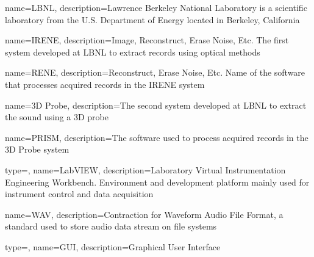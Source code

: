 %

{
    name=LBNL,
    description={Lawrence Berkeley National Laboratory is a scientific laboratory from the U.S. Department of Energy located in Berkeley, California}
}

{
    name=IRENE,
    description={Image, Reconstruct, Erase Noise, Etc. The first system developed at LBNL to extract records using optical methods}
}

{
    name=RENE,
    description={Reconstruct, Erase Noise, Etc. Name of the software that processes acquired records in the IRENE system}
}

{
    name=3D Probe,
    description={The second system developed at LBNL to extract the sound using a 3D probe}
}

{
    name=PRISM,
    description={The software used to process acquired records in the 3D Probe system}
}

{
    type=\acronymtype,
    name={LabVIEW},
    description={Laboratory Virtual Instrumentation Engineering Workbench. Environment and development platform mainly used for instrument control and data acquisition}
}

{
    name={WAV},
    description={Contraction for Waveform Audio File Format, a standard used to store audio data stream on file systems}
}

{
    type=\acronymtype,
    name={GUI},
    description={Graphical User Interface}
}

